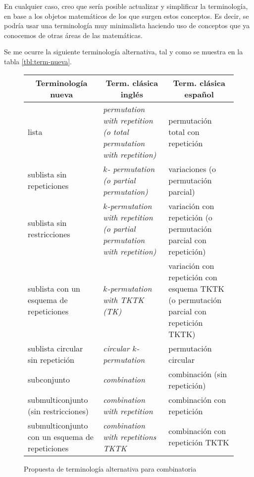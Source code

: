 
En cualquier caso, creo que sería posible actualizar y simplificar la
terminología, en base a los objetos matemáticos de los que surgen estos
conceptos. Es decir, se podría usar una terminología muy minimalista
haciendo uso de conceptos que ya conocemos de otras áreas de las
matemáticas.

Se me ocurre la siguiente terminología alternativa, tal y como se muestra en
la tabla \ref{tbl:term-nueva}.

\begin{landscape}
\begin{figure}%
  \caption{Propuesta de terminología alternativa para combinatoria}%
  \begin{center}
    \begin{tabular}[t]{| p{16em} | p{16em} | p{16em} |}
      \hline
      \multicolumn{1}{|c}{\textbf{Terminología nueva}} &
      \multicolumn{1}{|c}{\textbf{Term. clásica inglés}} &
      \multicolumn{1}{|c|}{\textbf{Term. clásica español}} \\
      \hline\hline
      lista &
      \emph{permutation with repetition (o total permutation with repetition)} &
      permutación total con repetición \\
      \hline
      sublista sin repeticiones &
      \emph{$k$- permutation (o partial permutation)} &
      variaciones (o permutación parcial) \\
      \hline
      sublista sin restricciones &
      \emph{$k$-permutation with repetition (o partial permutation with repetition)} &
      variación con repetición (o permutación parcial con repetición) \\
      \hline
      sublista con un esquema de repeticiones &
      \emph{$k$-permutation with TKTK (TK)} &
      variación con repetición con esquema TKTK (o permutación parcial con repetición TKTK) \\
      \hline
      sublista circular sin repetición &
      \emph{circular $k$-permutation} &
      permutación circular \\
      \hline
      \hline
      subconjunto &
      \emph{combination} &
      combinación (sin repetición) \\
      \hline
      submulticonjunto (sin restricciones) &
      \emph{combination with repetition} &
      combinación con repetición \\
      \hline
      submulticonjunto con un esquema de repeticiones &
      \emph{combination with repetitions TKTK} &
      combinación con repetición TKTK \\
      \hline
    \end{tabular}%
  \end{center}
\end{figure}%
\label{tbl:term-nueva}
\end{landscape}

